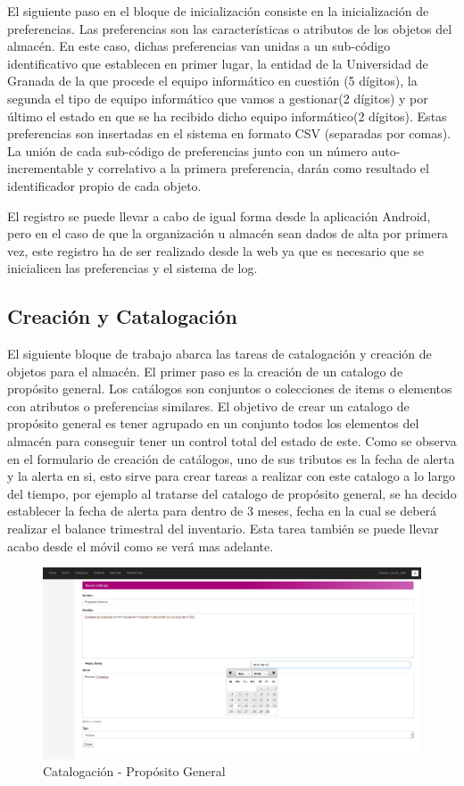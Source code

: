 \documentclass[a4paper,11pt]{book}
\begin{document}
El siguiente paso en el bloque de inicialización consiste en la inicialización de preferencias. Las preferencias son las características o atributos de los objetos del almacén. En este caso, dichas preferencias van unidas a un sub-código identificativo que establecen en primer lugar, la entidad de la Universidad de Granada de la que procede el equipo informático en cuestión (5 dígitos), la segunda el tipo de equipo informático que vamos a gestionar(2 dígitos) y por último el estado en que se ha recibido dicho equipo informático(2 dígitos). Estas preferencias son insertadas en el sistema en formato CSV (separadas por comas). La unión de cada sub-código de preferencias junto con un número auto-incrementable y correlativo a  la primera preferencia, darán como resultado el identificador propio de cada objeto. 

El registro se puede llevar a cabo de igual forma desde la aplicación Android, pero en el caso de que la organización u almacén sean dados de alta por primera vez, este registro ha de ser realizado desde la web ya que es necesario que se inicialicen las preferencias y el sistema de log.


\subsection{Creación y Catalogación}

El siguiente bloque de trabajo abarca las tareas de catalogación y creación de objetos para el almacén. El primer paso es la creación de un catalogo de propósito general. Los catálogos son conjuntos o colecciones de items o elementos con atributos o preferencias similares. El objetivo de crear un catalogo de propósito general es tener agrupado en un conjunto todos los elementos del almacén para conseguir tener un control total del estado de este. Como se observa en el formulario de creación de catálogos, uno de sus tributos es la fecha de alerta y la alerta en si, esto sirve para crear tareas a realizar con este catalogo a lo largo del tiempo, por ejemplo al tratarse del catalogo de propósito general, se ha decido establecer la fecha de alerta para dentro de 3 meses, fecha en la cual se deberá realizar el balance trimestral del inventario. Esta tarea también se puede llevar acabo desde el móvil como se verá mas adelante. 

\begin{figure}[H] 
\centering 
\includegraphics[scale=0.2]{imagenes/pruebas/catalogo_general.png}
\caption{ Catalogación - Propósito General\cite{propio}}
\end{figure}
\end{document}
